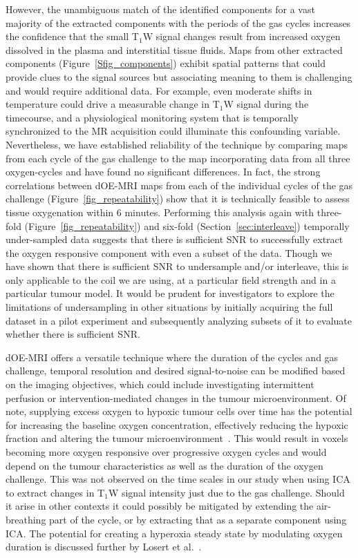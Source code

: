 However, the unambiguous match of the identified components for a vast majority of the extracted components with the periods of the gas cycles increases the confidence that the small T$_1$W signal changes result from increased oxygen dissolved in the plasma and interstitial tissue fluids.
Maps from other extracted components (Figure~\ref{Sfig_components}) exhibit spatial patterns that could provide clues to the signal sources but associating meaning to them is challenging and would require additional data.
For example, even moderate shifts in temperature could drive a measurable change in T$_1$W signal during the timecourse, and a physiological monitoring system that is temporally synchronized to the MR acquisition could illuminate this confounding variable. 
Nevertheless, we have established reliability of the technique by comparing maps from each cycle of the gas challenge to the map incorporating data from all three oxygen-cycles and have found no significant differences.
In fact, the strong correlations between \acs{dOE-MRI} maps from each of the individual cycles of the gas challenge (Figure~\ref{fig_repeatability}) show that it is technically feasible to assess tissue oxygenation within 6 minutes.
Performing this analysis again with three-fold (Figure~\ref{fig_repeatability}) and six-fold (Section~\ref{sec:interleave}) temporally under-sampled data suggests that there is sufficient \acs{SNR} to successfully extract the oxygen responsive component  with even a subset of the data.
Though we have shown that there is sufficient SNR to undersample and/or interleave, this is only applicable to the coil we are using, at a particular field strength and in a particular tumour model. 
It would be prudent for investigators to explore the limitations of undersampling in other situations by initially acquiring the full dataset in a pilot experiment and subsequently analyzing subsets of it to evaluate whether there is sufficient SNR.

\acs{dOE-MRI} offers a versatile technique where the duration of the cycles and gas challenge, temporal resolution and desired signal-to-noise can be modified based on the imaging objectives, which could include investigating intermittent perfusion or intervention-mediated changes in the tumour microenvironment.
Of note, supplying excess oxygen to hypoxic tumour cells over time has the potential for increasing the baseline oxygen concentration, effectively reducing the hypoxic fraction and altering the tumour microenvironment~\cite{Linnik:2013hf}.
This would result in voxels becoming more oxygen responsive over progressive oxygen cycles and would depend on the tumour characteristics as well as the duration of the oxygen challenge.
This was not observed on the time scales in our study when using \acs{ICA} to extract changes in T$_1$W signal intensity just due to the gas challenge. 
Should it arise in other contexts it could possibly be mitigated by extending the air-breathing part of the cycle, or by extracting that as a separate component using \acs{ICA}.
The potential for creating a hyperoxia steady state by modulating oxygen duration is discussed further by Losert et al.~\cite{Losert:2002gt}.

